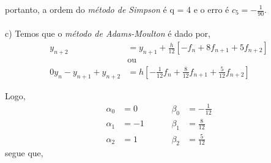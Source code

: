 \documentclass[a4paper,12pt]{article}
\begin{document}
portanto, a ordem do \textit{m\'etodo de Simpson} \'e q = 4 e o erro \'e $c_5 = -\frac{1}{90}.$
\\ \\
c) Temos que o \textit{m\'etodo de Adams-Moulton} \'e dado por,
	\begin{align*}
		y_{n+2} &= y_{n+1} + \frac{h}{12}[-f_{n} + 8f_{n+1} + 5f_{n+2}]\\
		&\mbox{ou} \\
		0y_{n} - y_{n+1} + y_{n+2} &= h[-\frac{1}{12}f_{n} + \frac{8}{12}f_{n+1} + \frac{5}{12}f_{n+2}]
	\end{align*} 

Logo,
	\begin{align*}
		\alpha_{0} &=  0 \hspace{1cm}& \beta_{0} &= -\frac{1}{12}\\
		\alpha_{1} &= -1 \hspace{1cm}& \beta_{1} &= \frac{8}{12}\\
		\alpha_{2} &=  1 \hspace{1cm}& \beta_{2} &= \frac{5}{12}
	\end{align*}
segue que,
\end{document}
